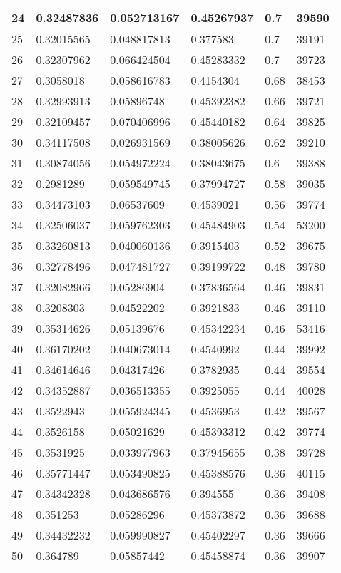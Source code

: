 \begin{longtable}{|l|l|l|l|l|l|}
24 & 0.32487836 & 0.052713167 & 0.45267937 & 0.7 & 39590 \\ \hline 
25 & 0.32015565 & 0.048817813 & 0.377583 & 0.7 & 39191 \\ \hline 
26 & 0.32307962 & 0.066424504 & 0.45283332 & 0.7 & 39723 \\ \hline 
27 & 0.3058018 & 0.058616783 & 0.4154304 & 0.68 & 38453 \\ \hline 
28 & 0.32993913 & 0.05896748 & 0.45392382 & 0.66 & 39721 \\ \hline 
29 & 0.32109457 & 0.070406996 & 0.45440182 & 0.64 & 39825 \\ \hline 
30 & 0.34117508 & 0.026931569 & 0.38005626 & 0.62 & 39210 \\ \hline 
31 & 0.30874056 & 0.054972224 & 0.38043675 & 0.6 & 39388 \\ \hline 
32 & 0.2981289 & 0.059549745 & 0.37994727 & 0.58 & 39035 \\ \hline 
33 & 0.34473103 & 0.06537609 & 0.4539021 & 0.56 & 39774 \\ \hline 
34 & 0.32506037 & 0.059762303 & 0.45484903 & 0.54 & 53200 \\ \hline 
35 & 0.33260813 & 0.040060136 & 0.3915403 & 0.52 & 39675 \\ \hline 
36 & 0.32778496 & 0.047481727 & 0.39199722 & 0.48 & 39780 \\ \hline 
37 & 0.32082966 & 0.05286904 & 0.37836564 & 0.46 & 39831 \\ \hline 
38 & 0.3208303 & 0.04522202 & 0.3921833 & 0.46 & 39110 \\ \hline 
39 & 0.35314626 & 0.05139676 & 0.45342234 & 0.46 & 53416 \\ \hline 
40 & 0.36170202 & 0.040673014 & 0.4540992 & 0.44 & 39992 \\ \hline 
41 & 0.34614646 & 0.04317426 & 0.3782935 & 0.44 & 39554 \\ \hline 
42 & 0.34352887 & 0.036513355 & 0.3925055 & 0.44 & 40028 \\ \hline 
43 & 0.3522943 & 0.055924345 & 0.4536953 & 0.42 & 39567 \\ \hline 
44 & 0.3526158 & 0.05021629 & 0.45393312 & 0.42 & 39774 \\ \hline 
45 & 0.3531925 & 0.033977963 & 0.37945655 & 0.38 & 39728 \\ \hline 
46 & 0.35771447 & 0.053490825 & 0.45388576 & 0.36 & 40115 \\ \hline 
47 & 0.34342328 & 0.043686576 & 0.394555 & 0.36 & 39408 \\ \hline 
48 & 0.351253 & 0.05286296 & 0.45373872 & 0.36 & 39688 \\ \hline 
49 & 0.34432232 & 0.059990827 & 0.45402297 & 0.36 & 39666 \\ \hline 
50 & 0.364789 & 0.05857442 & 0.45458874 & 0.36 & 39907 \\ \hline 
\end{longtable}